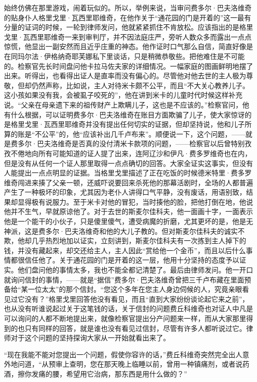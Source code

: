 始终仿佛在那里游戏，闹着玩似的。所以，举例来说，当审问费多尔·巴夫洛维奇的贴身仆人格里戈里·瓦西里耶维奇，在他作关于“通花园的门是开着的”这一最有分量的证词的时候，一轮到律师发问，他就紧紧抓住不肯放松。应该指出的是格里戈里·瓦西里耶维奇一来到审判厅，并不因法庭庄严，旁听人数众多而露出一点点惊慌，他显出一副安然而且近乎庄重的神态。他作证时口气那么自信，简直好像是在同玛尔法·伊格纳奇耶芙娜私下里谈话，只是稍微恭敬些。把他难住是不可能的。检察官先长时间盘问他卡拉马佐夫家的详细情况。一幅家庭的图画鲜明地摆了出来。听得出，也看得出证人是直率而没有偏心的。尽管他对他去世的主人极为尊敬，但却仍然声称，比如说，主人对待米卡颇不公平，而且“不大关心教养儿子。这小孩如果没有我，会被虱子咬死的”，他在讲到米卡的儿童时代时候这样补充说。“父亲在母亲遗下来的祖传财产上欺瞒儿子，这也是不应该的。”检察官问，他有什么根据，可以证明费多尔·巴夫洛维奇在账目方面欺骗了儿子，使大家惊讶的是格里戈里·瓦西里耶维奇并没有提出任何切实的证据，但却坚持说，他和儿子所算的账是“不公平”的，他“应该补出几千卢布来”。顺便说一下，这个问题，——就是费多尔·巴夫洛维奇是否真的没付清米卡款项的问题，——检察官以后曾特别孜孜不倦地向所有可能知道的证人提了出来，连阿辽沙和伊凡·费多罗维奇也在内，但是没有从任何一个证人那里取得一点点确切的回答。大家全证实这事实，但没有人能提出一点点明显的证据。当格里戈里描述了正在吃饭的时候德米特里·费多罗维奇闯进来揍了父亲一顿，还威吓说要回来杀死他的那幕活剧时，全场的人都普遍产生了一种极坏的印象，尤其因为老仆人讲得口气平静，没有废话，用语别致，结果却显得极有说服力。至于米卡对他的冒犯，当时揍他的脸，把他打倒在地，他说他并不生气，早就原谅他了。对于去世的斯麦尔佳科夫，他一面画十字，一面表示他是一个能干的小伙子，只是傻里傻气，遭受病魔的折磨，尤其更坏的是，他是无神派，这是费多尔·巴夫洛维奇和他的大儿子教的。但对斯麦尔佳科夫的诚实不欺，他却几乎热烈地加以证实，立刻讲到，斯麦尔佳科夫有一次拣到主人掉下的钱，并没有藏起来，却交还给主人，主人因此“赏给他一个金币”，而且以后什么事情都很信任他了。关于通花园的门是开着的这一层，他用十分坚持的态度予以证实。他们盘问他的事情太多，我也不能全都记清楚了。最后由律师发问。他一开口就询问信封的事情，——就是“据信”费多尔·巴夫洛维奇曾把三千卢布藏在里面预备给“某一位太太”的那个信封。“您这个多年在您主人身边伺候的人，究竟亲眼看见过它没有？”格里戈里回答他没有看见，而且“直到大家纷纷谈论起它来之前”，也从没有听谁说起过关于这笔钱的话，关于信封的问题费丘科维奇也对证人中凡是可以询问的人都不断地提出来，就像检察官提出分产问题来一样，而从大家那里得到的也只有同样的回答，就是谁也没有看见过信封，尽管有许多人都听说过它。律师对于这个问题的坚持探询大家从一开始就看出来了。
\par “现在我能不能对您提出一个问题，假使你容许的话，”费丘科维奇突然完全出人意外地问道，“从预审上查明，您在那天晚上临睡以前，曾用一种镇痛剂，或者说药酒，擦你发痛的腰，希望用它治病，那东西是用什么做的？”
